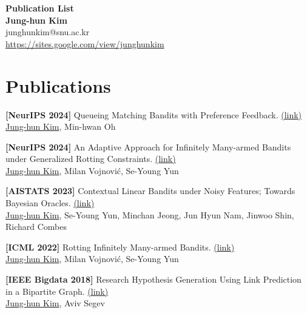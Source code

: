 \documentclass{article}
\begin{document}
\begin{center}
    \LARGE{\textbf{Publication List}} \\
    \vspace{1em}
    \normalsize\textbf{Jung-hun Kim} \\
    \normalsize{junghunkim@snu.ac.kr}\\ 
    \normalsize{\url{https://sites.google.com/view/junghunkim}}
\end{center}

\section*{Publications}
\begin{enumerate}[label={[\arabic*]}]
    \item \textbf{[NeurIPS 2024]} {Queueing Matching Bandits with Preference Feedback.} \href{https://arxiv.org/pdf/2410.10098}{(link)} \\
    \underline{Jung-hun Kim}, Min-hwan Oh

    \item \textbf{[NeurIPS 2024]}
    {An Adaptive Approach for Infinitely Many-armed Bandits under Generalized Rotting Constraints.} \href{https://arxiv.org/pdf/2404.14202}{(link)}  \\
    \underline{Jung-hun Kim}, Milan Vojnovi{\'c}, Se-Young Yun

    \item \textbf{[AISTATS 2023]}
    {Contextual Linear Bandits under Noisy Features; Towards Bayesian Oracles.} \href{https://arxiv.org/pdf/1703.01347}{(link)}\\
    \underline{Jung-hun Kim}, Se-Young Yun, Minchan Jeong, Jun Hyun Nam, Jinwoo Shin, Richard Combes

    \item \textbf{[ICML 2022]}
    {Rotting Infinitely Many-armed Bandits.} \href{https://arxiv.org/pdf/2201.12975}{(link)} \\
    \underline{Jung-hun Kim}, Milan Vojnovi{\'c}, Se-Young Yun


    \item \textbf{[IEEE Bigdata 2018]} {Research Hypothesis Generation Using Link Prediction in a Bipartite Graph.} \href{https://ieeexplore.ieee.org/stamp/stamp.jsp?tp=&arnumber=8622645}{(link)} \\
    \underline{Jung-hun Kim}, Aviv Segev
\end{enumerate}
\end{document}
